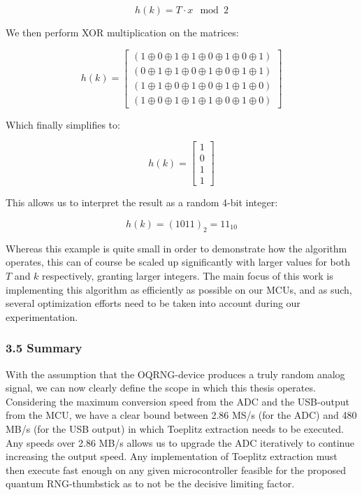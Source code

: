 \documentclass{sigchi}
\begin{document}
\[
h(k) = T \cdot x \mod 2
\]

\phantom{TEMP LINEBREAK}

We then perform XOR multiplication on the matrices:

\[
h(k) =
\begin{bmatrix}
(1 \oplus 0 \oplus 1 \oplus 1 \oplus 0 \oplus 1 \oplus 0 \oplus 1) \\
(0 \oplus 1 \oplus 1 \oplus 0 \oplus 1 \oplus 0 \oplus 1 \oplus 1) \\
(1 \oplus 1 \oplus 0 \oplus 1 \oplus 0 \oplus 1 \oplus 1 \oplus 0) \\
(1 \oplus 0 \oplus 1 \oplus 1 \oplus 1 \oplus 0 \oplus 1 \oplus 0)
\end{bmatrix}
\]

Which finally simplifies to:

\[
h(k) =
\begin{bmatrix}
1 \\
0 \\
1 \\
1
\end{bmatrix}
\]

This allows us to interpret the result as a random 4-bit integer:

\[
h(k) = (1011)_2 = 11_{10}
\]

Whereas this example is quite small in order to demonstrate how the algorithm operates, this can of course be scaled up significantly with larger values for both \(T\) and \(k\) respectively, granting larger integers. The main focus of this work is implementing this algorithm as efficiently as possible on our MCUs, and as such, several optimization efforts need to be taken into account during our experimentation.

\subsubsection{3.5 Summary}\label{summary}

With the assumption that the OQRNG-device produces a truly random analog signal, we can now clearly define the scope in which this thesis operates. Considering the maximum conversion speed from the ADC and the USB-output from the MCU, we have a clear bound between 2.86 MS/s (for the ADC) and 480 MB/s (for the USB output) in which Toeplitz extraction needs to be executed. Any speeds over 2.86 MB/s allows us to upgrade the ADC iteratively to continue increasing the output speed. Any implementation of Toeplitz extraction must then execute fast enough on any given microcontroller feasible for the proposed quantum RNG-thumbstick as to not be the decisive limiting factor.
\end{document}
